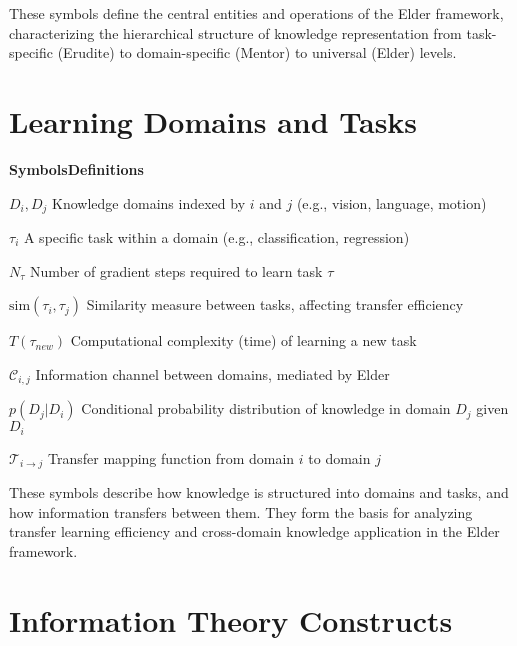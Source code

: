 \vspace{1cm}
\begin{center}
These symbols define the central entities and operations of the Elder framework, characterizing the hierarchical structure of knowledge representation from task-specific (Erudite) to domain-specific (Mentor) to universal (Elder) levels.
\end{center}

\clearpage
\chapter*{Learning Domains and Tasks}

\begin{multicols}{2}
\noindent\textbf{\large Symbols}\hfill\textbf{\large Definitions}

\vspace{0.3cm}
\noindent$D_i, D_j$ \dotfill Knowledge domains indexed by $i$ and $j$ (e.g., vision, language, motion)

\noindent$\tau_i$ \dotfill A specific task within a domain (e.g., classification, regression)

\noindent$N_{\tau}$ \dotfill Number of gradient steps required to learn task $\tau$

\noindent$\text{sim}(\tau_i, \tau_j)$ \dotfill Similarity measure between tasks, affecting transfer efficiency

\noindent$T(\tau_{new})$ \dotfill Computational complexity (time) of learning a new task

\noindent$\mathcal{C}_{i,j}$ \dotfill Information channel between domains, mediated by Elder

\noindent$p(D_j|D_i)$ \dotfill Conditional probability distribution of knowledge in domain $D_j$ given $D_i$

\noindent$\mathcal{T}_{i \to j}$ \dotfill Transfer mapping function from domain $i$ to domain $j$
\end{multicols}

\vspace{1cm}
\begin{center}
These symbols describe how knowledge is structured into domains and tasks, and how information transfers between them. They form the basis for analyzing transfer learning efficiency and cross-domain knowledge application in the Elder framework.
\end{center}

\clearpage
\chapter*{Information Theory Constructs}

